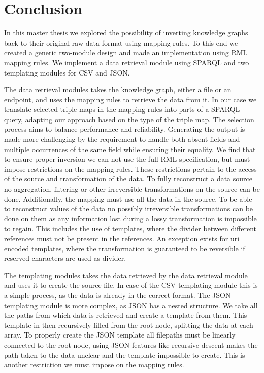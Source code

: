 \chapter{Conclusion}
\label{chapter:conclusion}
In this master thesis we explored the possibility of inverting knowledge graphs back to their original raw data format using mapping rules. To this end we created a generic two-module design and made an implementation using RML mapping rules. We implement a data retrieval module using SPARQL and two templating modules for CSV and JSON. 

The data retrieval modules takes the knowledge graph, either a file or an endpoint, and uses the mapping rules to retrieve the data from it. In our case we translate selected triple maps in the mapping rules into parts of a SPARQL query, adapting our approach based on the type of the triple map. The selection process aims to balance performance and reliability. Generating the output is made more challenging by the requirement to handle both absent fields and multiple occurrences of the same field while ensuring their equality. We find that to ensure proper inversion we can not use the full RML specification, but must impose restrictions on the mapping rules. These restrictions pertain to the access of the source and transformation of the data. To fully reconstruct a data source no aggregation, filtering or other irreversible transformations on the source can be done. Additionally, the mapping must use all the data in the source. To be able to reconstruct values of the data no possibly irreversible transformations can be done on them as any information lost during a lossy transformation is impossible to regain. This includes the use of templates, where the divider between different references must not be present in the references. An exception exists for uri encoded templates, where the transformation is guaranteed to be reversible if reserved characters are used as divider.

The templating modules takes the data retrieved by the data retrieval module and uses it to create the source file. In case of the CSV templating module this is a simple process, as the data is already in the correct format. The JSON templating module is more complex, as JSON has a nested structure. We take all the paths from which data is retrieved and create a template from them. This template in then recursively filled from the root node, splitting the data at each array. To properly create the JSON template all filepaths must be linearly connected to the root node, using JSON features like recursive descent makes the path taken to the data unclear and the template impossible to create. This is another restriction we must impose on the mapping rules.

